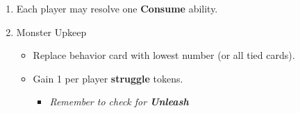 \documentclass[12pt]{article}
\newenvironment{enumerateCustom}
{\begin{enumerate}
  \setlength{\itemsep}{1pt}
  \setlength{\parskip}{0pt}
  \setlength{\parsep}{0pt}}
{\end{enumerate}}
\newenvironment{itemizeCustom}
{\begin{itemize}
  \setlength{\itemsep}{1pt}
  \setlength{\parskip}{0pt}
  \setlength{\parsep}{0pt}}
{\end{itemize}}
\begin{document}
\begin{mdframed}[style=SummaryCard, align=center, userdefinedwidth=35em, frametitle={Round Order Guide}]

    \begin{enumerateCustom}
        \item Each player may resolve one \textbf{Consume} ability.
        \item Monster Upkeep
            \begin{itemizeCustom}
                \item Replace behavior card with lowest number (or all tied cards).
                \item Gain 1 per player \textbf{struggle} tokens.
                    \begin{itemizeCustom}
                        \item \textit{Remember to check for \textbf{Unleash}}
                    \end{itemizeCustom}
            \end{itemizeCustom}


\end{enumerateCustom}
\end{mdframed}
\end{document}
